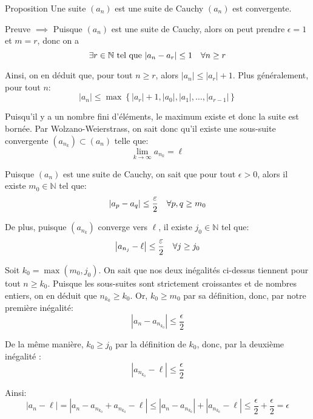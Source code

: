 \documentclass[a4paper]{article}
\begin{document}
\begin{parag}{Proposition}
    Une suite $\left(a_n\right)$ est une suite de Cauchy  $\left(a_n\right)$ est convergente. 

    \begin{subparag}{Preuve $\implies$}
        Puisque $\left(a_n\right)$ est une suite de Cauchy, alors on peut prendre $\epsilon = 1$ et $m = r$, donc on a 
        \[\exists r \in \mathbb{N} \telque \left|a_n - a_r\right| \leq 1 \mathspace \forall n \geq r\]

        Ainsi, on en déduit que, pour tout $n \geq r$, alors $\left|a_n\right| \leq \left|a_r\right| + 1$. Plus généralement, pour tout $n$:
        \[\left|a_n\right| \leq \max\left\{\left|a_r\right| + 1, \left|a_0\right|, \left|a_1\right|, \ldots, \left|a_{r-1}\right|\right\}\]
        
        Puisqu'il y a un nombre fini d'éléments, le maximum existe et donc la suite est bornée. Par Wolzano-Weierstrass, on sait donc qu'il existe une sous-suite convergente $\left(a_{n_k}\right) \subset \left(a_n\right)$ telle que:
        \[\lim_{k \to \infty} a_{n_k} = \ell\]
        
        Puisque $\left(a_n\right)$ est une suite de Cauchy, on sait que pour tout $\epsilon > 0$, alors il existe $m_0 \in \mathbb{N}$ tel que: 
        \[\left|a_p - a_q\right| \leq \frac{\epsilon}{2} \mathspace \forall p, q \geq m_0\]
        
        De plus, puisque $\left(a_{n_k}\right)$ converge vers $\ell$, il existe $j_0 \in \mathbb{N}$ tel que:
        \[\left|a_{n_j} - \ell\right| \leq \frac{\epsilon}{2} \mathspace \forall j \geq j_0\]
        
        Soit $k_0 = \max\left(m_0, j_0\right)$. On sait que nos deux inégalités ci-dessus tiennent pour tout $n \geq k_0$. Puisque les sous-suites sont strictement croissantes et de nombres entiers, on en déduit que $n_{k_0} \geq k_0$. Or, $k_0 \geq m_0$ par sa définition, donc, par notre première inégalité: 
        \[\left|a_{n} - a_{n_{k_0}}\right| \leq \frac{\epsilon}{2}\]
        

        De la même manière, $k_0 \geq j_0$ par la définition de $k_0$, donc, par la deuxième inégalité : 
        \[\left|a_{n_{k_0}} - \ell\right| \leq \frac{\epsilon}{2}\]
        
        Ainsi: 
        \[\left|a_{n} - \ell\right| = \left|a_n - a_{n_{k_0}} + a_{n_{k_0}} - \ell\right| \leq \left|a_n - a_{n_{k_0}}\right| + \left|a_{n_{k_0}} - \ell\right| \leq \frac{\epsilon}{2} + \frac{\epsilon}{2} = \epsilon\]


\end{subparag}
\end{parag}
\end{document}
